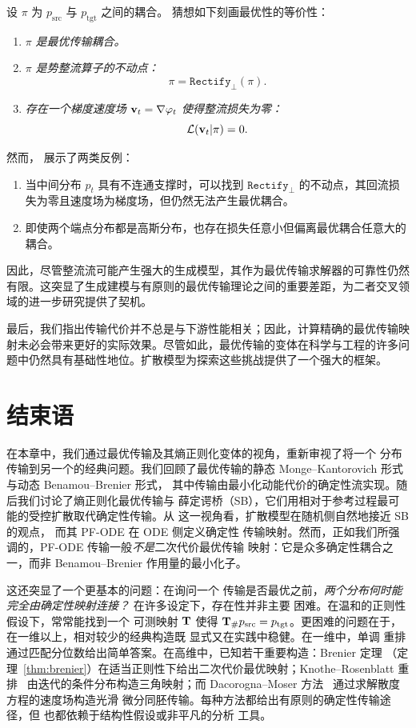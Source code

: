 设 $\pi$ 为 $p_{\mathrm{src}}$ 与 $p_{\mathrm{tgt}}$ 之间的耦合。\citet{liu2022flow} 猜想如下刻画最优性的等价性：
\begin{enumerate}[label=(\textit{\roman*})]
  \item $\pi$ \textit{是最优传输耦合。}
  \item $\pi$ \textit{是势整流算子的不动点：}
  \[
    \pi = \texttt{Rectify}_{\perp}(\pi).
  \]
  \item \textit{存在一个梯度速度场 ${\mathbf{v}}_t = \nabla \varphi_t$ 使得整流损失为零：}
  \[
    \mathcal{L}({\mathbf{v}}_t |\pi) = 0.
  \]
\end{enumerate}
然而，\citet{hertrich2025relation} 展示了两类反例：
\begin{enumerate}
  \item 当中间分布 $p_t$ 具有不连通支撑时，可以找到 $\texttt{Rectify}_{\perp}$ 的不动点，其回流损失为零且速度场为梯度场，但仍然无法产生最优耦合。
  \item 即使两个端点分布都是高斯分布，也存在损失任意小但偏离最优耦合任意大的耦合。
\end{enumerate}

因此，尽管整流流可能产生强大的生成模型，其作为最优传输求解器的可靠性仍然有限。这突显了生成建模与有原则的最优传输理论之间的重要差距，为二者交叉领域的进一步研究提供了契机。

最后，我们指出传输代价并不总是与下游性能相关；因此，计算精确的最优传输映射未必会带来更好的实际效果。尽管如此，最优传输的变体在科学与工程的许多问题中仍然具有基础性地位。扩散模型为探索这些挑战提供了一个强大的框架。

\newpage
\section{结束语}
在本章中，我们通过最优传输及其熵正则化变体的视角，重新审视了将一个
分布传输到另一个的经典问题。我们回顾了最优传输的静态
Monge--Kantorovich 形式与动态 Benamou--Brenier 形式，
其中传输由最小化动能代价的确定性流实现。随后我们讨论了熵正则化最优传输与
薛定谔桥（SB），它们用相对于参考过程最可能的受控扩散取代确定性传输。从
这一视角看，扩散模型在随机侧自然地接近 SB 的观点，
而其 PF-ODE 在 ODE 侧定义确定性
传输映射。然而，正如我们所强调的，PF-ODE
传输一般\emph{不是}二次代价最优传输
映射：它是众多确定性耦合之一，而非
Benamou--Brenier 作用量的最小化子。

这还突显了一个更基本的问题：在询问一个
传输是否最优之前，\emph{两个分布何时能完全由确定性映射连接？} 在许多设定下，存在性并非主要
困难。在温和的正则性假设下，常常能找到一个
可测映射 ${\mathbf{T}}$ 使得
${\mathbf{T}}_\# p_{\mathrm{src}} = p_{\mathrm{tgt}}$。更困难的问题在于，
在一维以上，相对较少的经典构造既
显式又在实践中稳健。在一维中，单调
重排通过匹配分位数给出简单答案。在高维中，已知若干重要构造：Brenier 定理
（定理~\ref{thm:brenier}）在适当正则性下给出二次代价最优映射；Knothe--Rosenblatt
重排~\citep{rosenblatt1952remarks,knothe1957contributions}
由迭代的条件分布构造三角映射；而
Dacorogna--Moser 方法~\citep{dacorogna1990partial} 通过求解散度
方程的速度场构造光滑
微分同胚传输。每种方法都给出有原则的确定性传输途径，但
也都依赖于结构性假设或非平凡的分析
工具。

